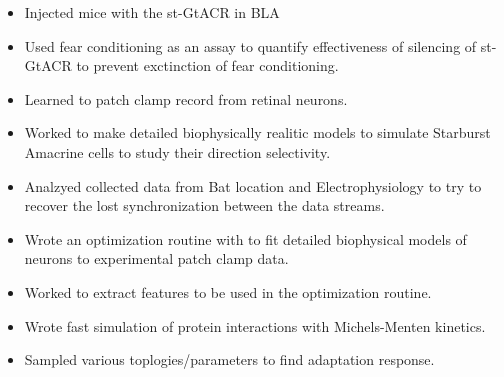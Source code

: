 \documentclass[10pt,a4paper]{altacv}
\begin{document}
\begin{itemize}
\item Injected mice with the st-GtACR in BLA
\item Used fear conditioning as an assay to quantify effectiveness of silencing of st-GtACR to prevent exctinction of fear conditioning.
\end{itemize}


\divider


\begin{itemize}
\item Learned to patch clamp record from retinal neurons.
\item Worked to make detailed biophysically realitic models to simulate Starburst Amacrine cells to study their direction selectivity.
\end{itemize}

\divider


\begin{itemize}
\item Analzyed collected data from Bat location and Electrophysiology to try to recover the lost synchronization between the data streams.
\end{itemize}


\divider



\begin{itemize}
\item Wrote an optimization routine with to fit detailed biophysical models of neurons to experimental patch clamp data.
\item Worked to extract features to be used in the optimization routine.
\end{itemize}

\vspace{2em}



\begin{itemize}
\item Wrote fast simulation of protein interactions with Michels-Menten kinetics.
\item Sampled various toplogies/parameters to find adaptation response. 
\end{itemize}
\end{document}
